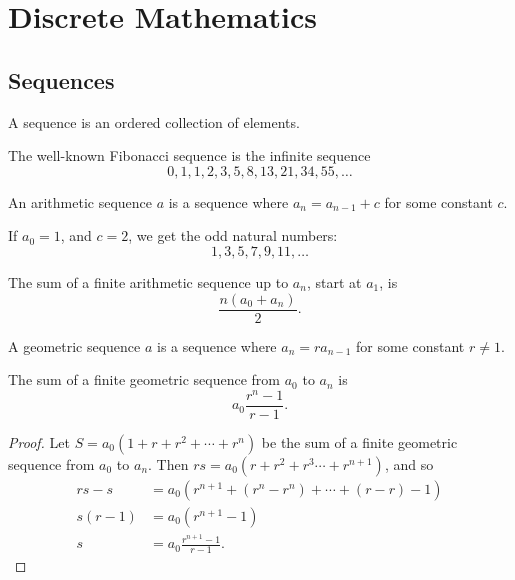 \chapter{Discrete Mathematics}
\label{ch:discrete}

\section{Sequences}

\begin{defn}
    A sequence is an ordered collection of elements.
\end{defn}

\begin{exmp}
    The well-known Fibonacci sequence is the infinite sequence \[0, 1, 1, 2, 3, 5, 8, 13, 21, 34, 55, \ldots\]
\end{exmp}

\begin{defn}
    An arithmetic sequence $a$ is a sequence where $a_n = a_{n-1} + c$ for some constant $c$.
\end{defn}

\begin{exmp}
    If $a_0 = 1$, and $c = 2$, we get the odd natural numbers: \[1, 3, 5, 7, 9, 11, \ldots\]
\end{exmp}

\begin{prop}
    The sum of a finite arithmetic sequence up to $a_n$, start at $a_1$, is \[\frac{n(a_0 + a_n)}{2}.\]
\end{prop}

\begin{defn}
    A geometric sequence $a$ is a sequence where $a_n = ra_{n-1}$ for some constant $r \neq 1$.
\end{defn}

\begin{prop}
    The sum of a finite geometric sequence from $a_0$ to $a_n$ is \[a_0\frac{r^n - 1}{r - 1}.\]
\end{prop}

\begin{proof}
    Let $S = a_0(1 + r + r^2 + \cdots + r^n)$ be the sum of a finite geometric sequence from $a_0$ to $a_n$. Then $rs = a_0(r + r^2 + r^3 \cdots + r^{n+1})$, and so
    \begin{align}
        rs - s &= a_0(r^{n+1} + (r^n - r^n) + \cdots + (r - r) - 1)\\
        s(r - 1) &= a_0(r^{n+1} - 1) \\
    s &= a_0\frac{r^{n+1} - 1}{r - 1}.
    \end{align}
\end{proof}


